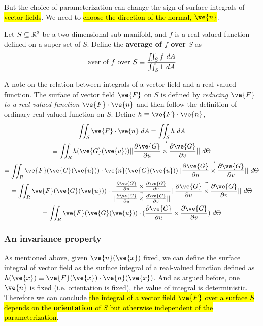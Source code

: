 \documentclass[11pt]{article}
\begin{document}
				\begin{remark}
					But the choice of parameterization can change the sign of surface integrals of \hl{vector fields}. We need to \hl{choose the direction of the normal, $\ve{n}$}.
				\end{remark}
				
				\begin{definition}
					Let $S \subseteq \mathbb{R}^3$ be a two dimensional sub-manifold, and $f$ is a real-valued function defined on a super set of $S$. Define the \textbf{average of $f$ over $S$} as
					\begin{equation}
						\text{{aver of $f$ over $S$}} \equiv \frac{\iint_S f\ dA}{\iint_S1\ dA}
					\end{equation}
				\end{definition}
				
				\begin{remark}
					A note on the relation between integrals of a vector field and a real-valued function. The surface of vector field $\ve{F}$ on $S$ is defined by \emph{reducing $\ve{F}$ to a real-valued function $\ve{F}\cdot \ve{n}$} and then follow the definition of ordinary real-valued function on $S$. Define $h \equiv \ve{F} \cdot \ve{n}$,
					\begin{gather}
						\iint_S \ve{F} \cdot \ve{n}\ dA = \iint_S h\ dA \\
						\equiv \iint_R h(\ve{G}(\ve{u})) \norm{\pd{\ve{G}}{u} \times \pd{\ve{G}}{v}}\ d\Theta \\
						= \iint_R \ve{F}(\ve{G}(\ve{u})) \cdot \ve{n}(\ve{G}(\ve{u})) \norm{\pd{\ve{G}}{u} \times \pd{\ve{G}}{v}}\ d\Theta \\
						= \iint_R \ve{F}(\ve{G}(\ve{u})) \cdot \frac{\pd{\ve{G}}{u} \times \pd{\ve{G}}{v}}{\norm{\pd{\ve{G}}{u} \times \pd{\ve{G}}{v}}} \norm{\pd{\ve{G}}{u} \times \pd{\ve{G}}{v}}\ d\Theta \\
						= \iint_R \ve{F}(\ve{G}(\ve{u})) \cdot (\pd{\ve{G}}{u} \times \pd{\ve{G}}{v})\ d\Theta
					\end{gather}
				\end{remark}
			\subsubsection{An invariance property}
				\begin{remark}
					As mentioned above, given $\ve{n}(\ve{x})$ fixed, we can define the surface integral of \ul{vector field} as the surface integral of a \ul{real-valued function} defined as $h(\ve{x}) \equiv \ve{F}(\ve{x}) \cdot \ve{n}(\ve{x})$. And as argued before, one $\ve{n}$ is fixed (i.e. orientation is fixed), the value of integral is deterministic. Therefore we can conclude \hl{the integral of a vector field $\ve{F}$ over a surface $S$ depends on the \textbf{orientation} of $S$ but otherwise independent of the parameterization}.
				\end{remark}
				
\end{document}
